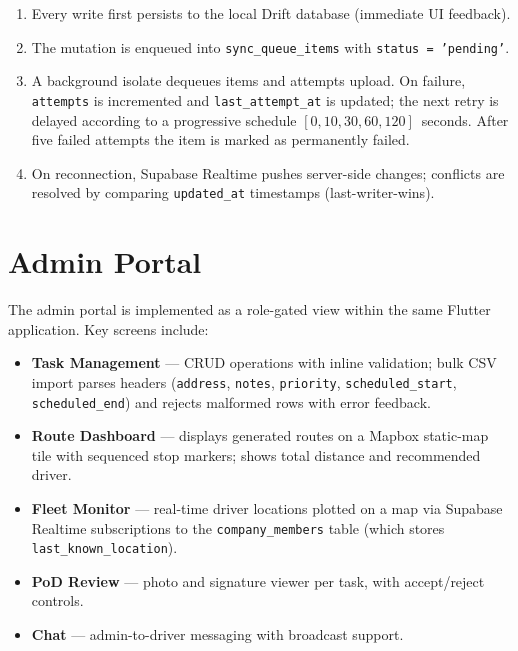 \begin{enumerate}
  \item Every write first persists to the local Drift database (immediate UI
        feedback).
  \item The mutation is enqueued into \texttt{sync\_queue\_items} with
        \texttt{status = 'pending'}.
  \item A background isolate dequeues items and attempts upload.  On failure,
        \texttt{attempts} is incremented and \texttt{last\_attempt\_at} is
        updated; the next retry is delayed according to a progressive
        schedule $[0, 10, 30, 60, 120]$~seconds.  After five failed attempts
        the item is marked as permanently failed.
  \item On reconnection, Supabase Realtime pushes server-side changes;
        conflicts are resolved by comparing \texttt{updated\_at} timestamps
        (last-writer-wins).
\end{enumerate}

\section{Admin Portal}
\label{sec:admin-impl}

The admin portal is implemented as a role-gated view within the same Flutter
application.  Key screens include:

\begin{itemize}
  \item \textbf{Task Management} — CRUD operations with inline validation;
        bulk CSV import parses headers (\texttt{address}, \texttt{notes},
        \texttt{priority}, \texttt{scheduled\_start}, \texttt{scheduled\_end})
        and rejects malformed rows with error feedback.
  \item \textbf{Route Dashboard} — displays generated routes on a Mapbox
        static-map tile with sequenced stop markers; shows total distance and
        recommended driver.
  \item \textbf{Fleet Monitor} — real-time driver locations plotted on a map
        via Supabase Realtime subscriptions to the \texttt{company\_members}
        table (which stores \texttt{last\_known\_location}).
  \item \textbf{PoD Review} — photo and signature viewer per task, with
        accept/reject controls.
  \item \textbf{Chat} — admin-to-driver messaging with broadcast support.
\end{itemize}

